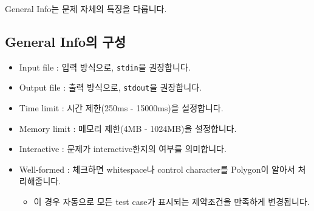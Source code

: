 \documentclass{article}
\begin{document}
    General Info는 문제 자체의 특징을 다룹니다.
    \subsection{General Info의 구성}
    \begin{itemize}
        \item Input file : 입력 방식으로, \verb|stdin|을 권장합니다.
        \item Output file : 출력 방식으로, \verb|stdout|을 권장합니다.
        \item Time limit : 시간 제한(250ms - 15000ms)을 설정합니다.
        \item Memory limit : 메모리 제한(4MB - 1024MB)을 설정합니다.
        \item Interactive : 문제가 interactive한지의 여부를 의미합니다.
        \item Well-formed : 체크하면 whitespace나 control character를 Polygon이 알아서 처리해줍니다.
        \begin{itemize}
            \item 이 경우 자동으로 모든 test case가 표시되는 제약조건을 만족하게 변경됩니다.
        \end{itemize}
    \end{itemize}
\end{document}
